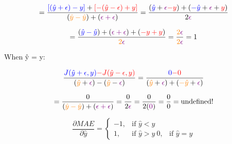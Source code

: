 \documentclass{article}
\begin{document}
\begin{displaymath}
=\frac{\textcolor{blue}{[(\hat{y}+\epsilon)-y]}+
\textcolor{red}{[-(\hat{y}-\epsilon)+y]}}
{(\textcolor{orange}{\hat{y}-\hat{y}})+(\textcolor{violet}{\epsilon+\epsilon})}
=\frac{(\textcolor{blue}{\hat{y}}+\textcolor{violet}{\epsilon}\textcolor{red}{-y})+
(\textcolor{blue}{-\hat{y}}+\textcolor{violet}{\epsilon}+\textcolor{red}{y})}
{2\textcolor{violet}{\epsilon}}
\end{displaymath}

\begin{displaymath}
=\frac{(\textcolor{blue}{\hat{y}-\hat{y}})+(\textcolor{violet}{\epsilon+\epsilon})+
(\textcolor{red}{-y+y})}{\textcolor{orange}{2}\textcolor{violet}{\epsilon}}
=\frac{\textcolor{orange}{2}\textcolor{violet}{\epsilon}}
{\textcolor{orange}{2}\textcolor{violet}{\epsilon}}
= 1
\end{displaymath}

\bigskip\bigskip
When ŷ = y:

\begin{displaymath}
\frac{\textcolor{blue}{J(\hat{y}+\epsilon, y)}
\textcolor{red}{-J(\hat{y}-\epsilon, y)}}
{(\textcolor{orange}{\hat{y}}+\textcolor{violet}{\epsilon})-(
\textcolor{orange}{\hat{y}}-\textcolor{violet}{\epsilon})}
=\frac{\textcolor{blue}{0}
\textcolor{red}{-0}}
{(\textcolor{orange}{\hat{y}}+\textcolor{violet}{\epsilon})+(
\textcolor{orange}{-\hat{y}}+\textcolor{violet}{\epsilon})}
\end{displaymath}

\begin{displaymath}
=\frac{0}{(\textcolor{orange}{\hat{y}-\hat{y}})+(\textcolor{violet}{\epsilon+\epsilon})}
=\frac{0}{2\textcolor{violet}{\epsilon}}
=\frac{0}{2(\textcolor{violet}{0})}
=\frac{0}{0}=\text{undefined!}
\end{displaymath}

\bigskip\bigskip
\begin{equation*}
\frac{\partial{}MAE}{\partial{}\hat{y}} = \left\{
\begin{array}{ccc}
-1, & \text{if }\hat{y} < y \\
1, & \text{if }\hat{y} > y \
0, & \text{if }\hat{y} = y
\end{array} \right.
\end{equation*}
\end{document}
